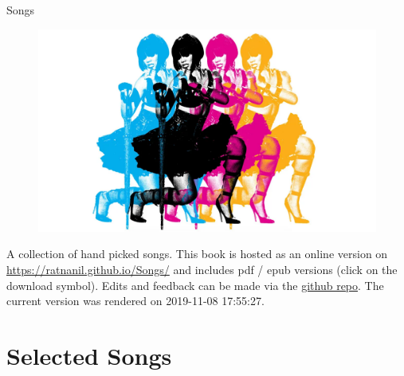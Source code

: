 \documentclass[]{book}
\title{}
\author{}
\date{}
\begin{document}

\begin{titlepage}
\begin{center}
  

\end{center}
\vspace{1.5cm}
\begin{center}

{\LARGE Songs}

\end{center}
 \vspace{1cm}

\begin{figure}[htbp]
  \centering
  \includegraphics[width=1\textwidth]{misc/title.png}
  \label{titelbild}
\end{figure}

\begin{center}
\textbf{}


\end{center} 

\vspace{1.0cm}


\end{titlepage}

{
\setcounter{tocdepth}{1}
\tableofcontents
}
A collection of hand picked songs. This book is hosted as an online version on \url{https://ratnanil.github.io/Songs/} and includes pdf / epub versions (click on the download symbol). Edits and feedback can be made via the \href{https://github.com/ratnanil/songs}{github repo}. The current version was rendered on 2019-11-08 17:55:27.

\hypertarget{selected-songs}{%
\chapter{Selected Songs}\label{selected-songs}}
\end{document}
